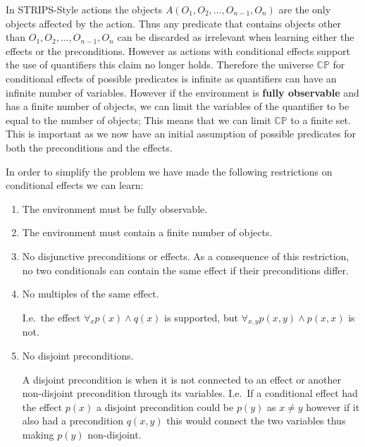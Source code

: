 \documentclass[../Master.tex]{subfiles}
\begin{document}
In STRIPS-Style actions the objects $A(O_1,O_2,\ldots,O_{n-1},O_n)$ are the only objects affected by the action.
Thus any predicate that contains objects other than $O_1,O_2,\ldots,O_{n-1},O_n$ can be discarded as irrelevant when learning either the effects or the preconditions.
However as actions with conditional effects support the use of quantifiers this claim no longer holds.
Therefore the universe $\mathbb{CP}$ for conditional effects of possible predicates is infinite as quantifiers can have an infinite number of variables.
However if the environment is \textbf{fully observable} and has a finite number of objects,
we can limit the variables of the quantifier to be equal to the number of objects; This means that we can limit $\mathbb{CP}$ to a finite set.
This is important as we now have an initial assumption of possible predicates for both the preconditions and the effects.

In order to simplify the problem we have made the following restrictions on conditional effects we can learn:
\begin{enumerate}[label=R\arabic*]
	\item The environment must be fully observable.
	\item The environment must contain a finite number of objects.
	\item \label{rst:ca:no-disjuntive-conditionals} No disjunctive preconditions or effects. As a consequence of this restriction, no two conditionals can contain the same effect if their preconditions differ.
	\item \label{rst:ca:no-multiple-effect} No multiples of the same effect.

		  I.e.\ the effect $\forall_x p(x) \land q(x)$ is supported, but $\forall_{x, y} p(x, y) \land p(x, x) $ is not.

	\item \label{rst:ca:no-disjoint-preconditions} No disjoint preconditions.

		  A disjoint precondition is when it is not connected to an effect or another non-disjoint precondition through its variables.
		  I.e.\ If a conditional effect had the effect $p(x)$ a disjoint precondition could be $p(y)$ as $x \neq y$ however if it also had a precondition $q(x,y)$ this would connect the two variables thus making $p(y)$ non-disjoint.
\end{enumerate}
\end{document}
